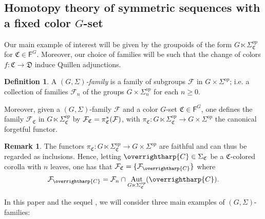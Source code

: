 \documentclass[a4paper,10pt
,draft
]{article}%
\numberwithin{equation}{section}
\numberwithin{figure}{section}
\theoremstyle{definition} %
\newtheorem{definition}[equation]{Definition}%
\newtheorem{remark}[equation]{Remark}%
\newcommand{\vect}[1]{\text{\overrightharp{\ensuremath{#1}}}}
\newcommand{\Fin}{\mathsf{F}}%
\DeclareMathOperator{\Aut}{Aut}%
\newcommand{\F}{\ensuremath{\mathcal F}}
\newcommand{\1}{\ensuremath{\mathbbm 1}}%
\begin{document}
\subsection{Homotopy theory of symmetric sequences with a fixed color $G$-set}
\label{SYMC_MS_SEC}


Our main example of interest will be given by the groupoids of the form
$G \ltimes \Sigma^{op}_{\mathfrak{C}}$ for 
$\mathfrak{C} \in \mathsf{F}^G$.
Moreover, our choice of families will be such that the
change of colors $f\colon \mathfrak{C} \to \mathfrak{D}$ 
induce Quillen adjunctions.


\begin{definition}\label{GSFAM_DEF}
      A \emph{$(G,\Sigma)$-family} is a family of subgroups $\mathcal{F}$ in $G \times \Sigma^{op}$;
      i.e.
      a collection of families $\F_n$ of the groups $G\times \Sigma_n^{op}$ for each $n \geq 0$.
      
      Moreover, given a $(G,\Sigma)$-family $\F$ and a color $G$-set $\mathfrak C \in \Fin^G$,
      one defines the family
      $\mathcal{F}_{\mathfrak{C}}$ in
      $G \ltimes \Sigma^{op}_{\mathfrak{C}}$
      by $\mathcal{F}_{\mathfrak{C}} = \pi^{\**}_{\mathfrak{C}}(\mathcal{F})$,
      with $\pi_{\mathfrak{C}} \colon G \ltimes \Sigma_{\mathfrak{C}}^{op} \to G \times \Sigma^{op}$
      the canonical forgetful functor.
\end{definition}






\begin{remark}
The functors
$\pi_{\mathfrak{C}} \colon
G \ltimes \Sigma_{\mathfrak{C}}^{op} \to
G \times \Sigma^{op}$
are faithful and can thus be regarded as inclusions.
Hence, letting $\vect{C} \in \Sigma_{\mathfrak{C}}$ be a
$\mathfrak{C}$-colored corolla with $n$ leaves,
one has that
$\F_{\mathfrak{C}} = \{\F_{\vect{C}}\}$ where
\begin{equation}\label{FAMC_DEF_EQ}
	\F_{\vect{C}} = \F_n \cap \Aut_{G \ltimes \Sigma_{\mathfrak C}^{op}}(\vect C).
\end{equation}
\end{remark}


In this paper and the sequel \cite{BP_TAS}, we will consider three main examples of $(G,\Sigma)$-families:
\end{document}
